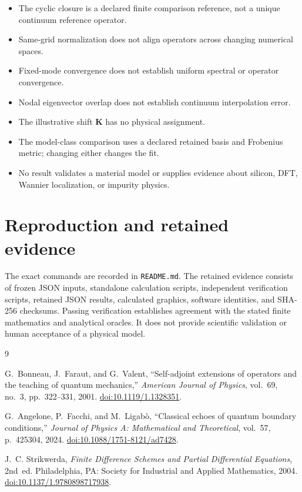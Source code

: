 \documentclass[11pt]{article}
\begin{document}
\begin{itemize}
  \item The cyclic closure is a declared finite comparison reference, not a
        unique continuum reference operator.
  \item Same-grid normalization does not align operators across changing
        numerical spaces.
  \item Fixed-mode convergence does not establish uniform spectral or operator
        convergence.
  \item Nodal eigenvector overlap does not establish continuum interpolation
        error.
  \item The illustrative shift $\mathbf K$ has no physical assignment.
  \item The model-class comparison uses a declared retained basis and
        Frobenius metric; changing either changes the fit.
  \item No result validates a material model or supplies evidence about
        silicon, DFT, Wannier localization, or impurity physics.
\end{itemize}

\section{Reproduction and retained evidence}

The exact commands are recorded in \texttt{README.md}. The retained evidence
consists of frozen JSON inputs, standalone calculation scripts, independent
verification scripts, retained JSON results, calculated graphics, software
identities, and SHA-256 checksums. Passing verification establishes agreement
with the stated finite mathematics and analytical oracles. It does not provide
scientific validation or human acceptance of a physical model.

\begin{thebibliography}{9}

G.~Bonneau, J.~Faraut, and G.~Valent,
``Self-adjoint extensions of operators and the teaching of quantum mechanics,''
\emph{American Journal of Physics}, vol.~69, no.~3, pp.~322--331, 2001.
\href{https://doi.org/10.1119/1.1328351}{doi:10.1119/1.1328351}.

G.~Angelone, P.~Facchi, and M.~Ligab\`o,
``Classical echoes of quantum boundary conditions,''
\emph{Journal of Physics A: Mathematical and Theoretical}, vol.~57,
p.~425304, 2024.
\href{https://doi.org/10.1088/1751-8121/ad7428}{doi:10.1088/1751-8121/ad7428}.

J.~C. Strikwerda,
\emph{Finite Difference Schemes and Partial Differential Equations}, 2nd~ed.
Philadelphia, PA: Society for Industrial and Applied Mathematics, 2004.
\href{https://doi.org/10.1137/1.9780898717938}{doi:10.1137/1.9780898717938}.

\end{thebibliography}
\end{document}
